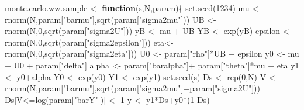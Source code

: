 \documentclass[
]{book}
\newenvironment{Shaded}{\begin{snugshade}}{\end{snugshade}}
\newcommand{\ControlFlowTok}[1]{\textcolor[rgb]{0.13,0.29,0.53}{\textbf{#1}}}
\newcommand{\DecValTok}[1]{\textcolor[rgb]{0.00,0.00,0.81}{#1}}
\newcommand{\FunctionTok}[1]{\textcolor[rgb]{0.00,0.00,0.00}{#1}}
\newcommand{\NormalTok}[1]{#1}
\newcommand{\OtherTok}[1]{\textcolor[rgb]{0.56,0.35,0.01}{#1}}
\newcommand{\SpecialCharTok}[1]{\textcolor[rgb]{0.00,0.00,0.00}{#1}}
\newcommand{\StringTok}[1]{\textcolor[rgb]{0.31,0.60,0.02}{#1}}
\theoremstyle{definition}
\theoremstyle{definition}
\theoremstyle{definition}
\theoremstyle{definition}
\theoremstyle{remark}
\begin{document}
\begin{Shaded}
\begin{Highlighting}[]
\NormalTok{monte.carlo.ww.sample }\OtherTok{\textless{}{-}} \ControlFlowTok{function}\NormalTok{(s,N,param)\{}
  \FunctionTok{set.seed}\NormalTok{(}\DecValTok{1234}\NormalTok{)}
\NormalTok{  mu }\OtherTok{\textless{}{-}} \FunctionTok{rnorm}\NormalTok{(N,param[}\StringTok{"barmu"}\NormalTok{],}\FunctionTok{sqrt}\NormalTok{(param[}\StringTok{"sigma2mu"}\NormalTok{]))}
\NormalTok{  UB }\OtherTok{\textless{}{-}} \FunctionTok{rnorm}\NormalTok{(N,}\DecValTok{0}\NormalTok{,}\FunctionTok{sqrt}\NormalTok{(param[}\StringTok{"sigma2U"}\NormalTok{]))}
\NormalTok{  yB }\OtherTok{\textless{}{-}}\NormalTok{ mu }\SpecialCharTok{+}\NormalTok{ UB }
\NormalTok{  YB }\OtherTok{\textless{}{-}} \FunctionTok{exp}\NormalTok{(yB)}
\NormalTok{  epsilon }\OtherTok{\textless{}{-}} \FunctionTok{rnorm}\NormalTok{(N,}\DecValTok{0}\NormalTok{,}\FunctionTok{sqrt}\NormalTok{(param[}\StringTok{"sigma2epsilon"}\NormalTok{]))}
\NormalTok{  eta}\OtherTok{\textless{}{-}} \FunctionTok{rnorm}\NormalTok{(N,}\DecValTok{0}\NormalTok{,}\FunctionTok{sqrt}\NormalTok{(param[}\StringTok{"sigma2eta"}\NormalTok{]))}
\NormalTok{  U0 }\OtherTok{\textless{}{-}}\NormalTok{ param[}\StringTok{"rho"}\NormalTok{]}\SpecialCharTok{*}\NormalTok{UB }\SpecialCharTok{+}\NormalTok{ epsilon}
\NormalTok{  y0 }\OtherTok{\textless{}{-}}\NormalTok{ mu }\SpecialCharTok{+}\NormalTok{  U0 }\SpecialCharTok{+}\NormalTok{ param[}\StringTok{"delta"}\NormalTok{]}
\NormalTok{  alpha }\OtherTok{\textless{}{-}}\NormalTok{ param[}\StringTok{"baralpha"}\NormalTok{]}\SpecialCharTok{+}\NormalTok{  param[}\StringTok{"theta"}\NormalTok{]}\SpecialCharTok{*}\NormalTok{mu }\SpecialCharTok{+}\NormalTok{ eta}
\NormalTok{  y1 }\OtherTok{\textless{}{-}}\NormalTok{ y0}\SpecialCharTok{+}\NormalTok{alpha}
\NormalTok{  Y0 }\OtherTok{\textless{}{-}} \FunctionTok{exp}\NormalTok{(y0)}
\NormalTok{  Y1 }\OtherTok{\textless{}{-}} \FunctionTok{exp}\NormalTok{(y1)}
  \FunctionTok{set.seed}\NormalTok{(s)}
\NormalTok{  Ds }\OtherTok{\textless{}{-}} \FunctionTok{rep}\NormalTok{(}\DecValTok{0}\NormalTok{,N)}
\NormalTok{  V }\OtherTok{\textless{}{-}} \FunctionTok{rnorm}\NormalTok{(N,param[}\StringTok{"barmu"}\NormalTok{],}\FunctionTok{sqrt}\NormalTok{(param[}\StringTok{"sigma2mu"}\NormalTok{]}\SpecialCharTok{+}\NormalTok{param[}\StringTok{"sigma2U"}\NormalTok{]))}
\NormalTok{  Ds[V}\SpecialCharTok{\textless{}=}\FunctionTok{log}\NormalTok{(param[}\StringTok{"barY"}\NormalTok{])] }\OtherTok{\textless{}{-}} \DecValTok{1} 
\NormalTok{  y }\OtherTok{\textless{}{-}}\NormalTok{ y1}\SpecialCharTok{*}\NormalTok{Ds}\SpecialCharTok{+}\NormalTok{y0}\SpecialCharTok{*}\NormalTok{(}\DecValTok{1}\SpecialCharTok{{-}}\NormalTok{Ds)}

\end{Highlighting}
\end{Shaded}
\end{document}
